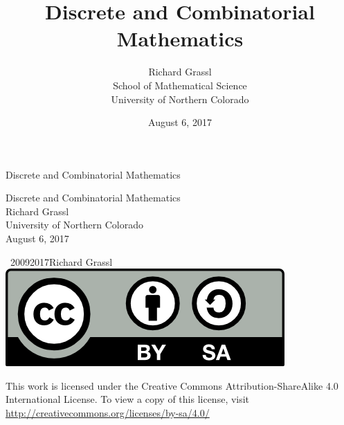 \documentclass[10pt,]{book}
\title{Discrete and Combinatorial Mathematics}
\author{Richard Grassl\\
School of Mathematical Science\\
University of Northern Colorado
}
\date{August 6, 2017}
\theoremstyle{plain}
\theoremstyle{definition}
\begin{document}
\frontmatter
\thispagestyle{empty}
{\centering
\vspace*{0.28\textheight}
{\Huge Discrete and Combinatorial Mathematics}\\}
\clearpage
\thispagestyle{empty}
\null%
\clearpage
\thispagestyle{empty}
{\centering
\vspace*{0.14\textheight}
{\Huge Discrete and Combinatorial Mathematics}\\[3\baselineskip]
{\Large Richard Grassl}\\[0.5\baselineskip]
{\Large University of Northern Colorado}\\[3\baselineskip]
{\Large August 6, 2017}\\}
\clearpage
\thispagestyle{empty}
\noindent\textcopyright\ 2009\textendash{}2017\quad{}Richard Grassl\\[0.5\baselineskip]
\includegraphics[width=0.15\linewidth]{../images/by-sa.png}
%
 \par
This work is licensed under the Creative Commons Attribution-ShareAlike 4.0 International License. To view a copy of this license, visit \href{http://creativecommons.org/licenses/by-sa/4.0/}{http://creativecommons.org/licenses/by-sa/4.0/}%
\par\medskip
{}
\null\clearpage
\setcounter{tocdepth}{2}
\renewcommand*\contentsname{Contents}
\tableofcontents
\mainmatter
\typeout{************************************************}
\typeout{************************************************}
\end{document}
